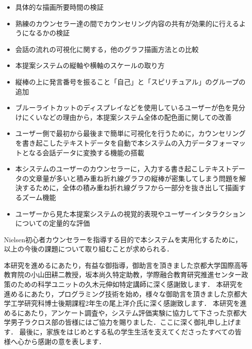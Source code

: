 \documentclass[shuuron]{kuee}
\begin{document}
\begin{itemize}
\item 具体的な描画所要時間の検証
\item 熟練のカウンセラー達の間でカウンセリング内容の共有が効果的に行えるようになるかの検証
\item 会話の流れの可視化に関する，他のグラフ描画方法との比較
\item 本提案システムの縦軸や横軸のスケールの取り方
\item 縦棒の上に発言番号を振ること「自己」と「スピリチュアル」のグループの追加
\item ブルーライトカットのディスプレイなどを使用しているユーザーが色を見分けにくいなどの理由から，本提案システム全体の配色面に関しての改善
\item ユーザー側で最初から最後まで簡単に可視化を行うために，カウンセリングを書き起こしたテキストデータを自動で本システムの入力データフォーマットとなる会話データに変換する機能の搭載
\item 本システムのユーザーのカウンセラーに，入力する書き起こしテキストデータの文章量が多いと積み重ね折れ線グラフの縦棒が密集してしまう問題を解決するために，全体の積み重ね折れ線グラフから一部分を抜き出して描画するズーム機能
\item ユーザーから見た本提案システムの視覚的表現やユーザーインタラクションについての定量的な評価
\end{itemize}

Nielsen初心者カウンセラーを指導する目的で本システムを実用化するために，以上の今後の課題について取り組むことが求められる．%



\begin{acknowledgements}
	本研究を進めるにあたり，有益な御指導，御助言を頂きました京都大学国際高等教育院の小山田耕二教授，坂本尚久特定助教，学際融合教育研究推進センター政策のための科学ユニットの久木元伸如特定講師に深く感謝致します．
	本研究を進めるにあたり，プログラミング技術を始め，様々な御助言を頂きました京都大学工学研究科博士後期課程2年生の尾上洋介氏に深く感謝致します．
	本研究を進めるにあたり，アンケート調査や，システム評価実験に協力して下さった京都大学男子ラクロス部の皆様にはご協力を賜りました．ここに深く御礼申し上げます．
	最後に，家族をはじめとする私の学生生活を支えてくださったすべての皆様へ心から感謝の意を表します．
\end{acknowledgements}
\end{document}
